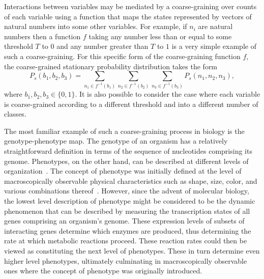 Interactions between variables may be mediated by a coarse-graining over counts of each variable using a function that maps the states represented by vectors of natural numbers into some other variables. For example, if $n_i$ are natural numbers
then a function $f$ taking any number less than or equal to some threshold $T$ to $0$ and any number greater than $T$ to $1$ is a very simple example of such a coarse-graining. For this specific form of the coarse-graining function $f$, the coarse-grained stationary probability distribution takes the form
$$
P_s(b_1,b_2,b_3) = \sum_{n_1 \in f^{-1}(b_1)}\sum_{n_2 \in f^{-1}(b_2)}\sum_{n_3 \in f^{-1}(b_3)} P_s(n_1,n_2,n_3),
$$
where $b_1,b_2,b_3 \in \{ 0,1 \}$. It is also possible to consider the case where each variable is coarse-grained according to a different threshold and into a different number of classes.

The most familiar example of such a coarse-graining process in biology is the genotype-phenotype map. The genotype of an organism has a relatively straightforward definition in terms of the sequence of nucleotides comprising its genome. Phenotypes, on the other hand, can be described at different levels of organization~\cite{Dawkins1982,Stadler2001}. The concept of phenotype was initially defined at the level of macroscopically observable physical characteristics such as shape, size, color, and various combinations thereof~\cite{Johannsen1911}. However, since the advent of molecular biology, the lowest level description of phenotype might be considered to be the dynamic phenomenon that can be described by measuring the transcription states of all genes comprising an organism's genome.  These expression levels of subsets of interacting genes determine which enzymes are produced, thus determining the rate at which metabolic reactions proceed.  These reaction rates could then be viewed as constituting the next level of phenotypes.  These in turn determine even higher level phenotypes, ultimately culminating in macroscopically observable ones where the concept of phenotype was originally introduced.

